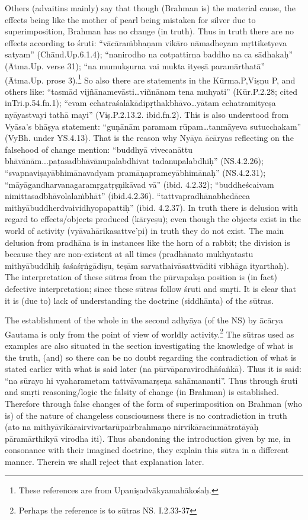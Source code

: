 Others (advaitins mainly) say that though (Brahman is) the material cause, the effects being like the mother of pearl being mistaken for silver due to superimposition, Brahman has no change (in truth). Thus in truth there are no effects according to śruti: “vācāraṁbhaṇam vikāro nāmadheyam mṛttiketyeva satyam” (Chānd.Up.6.1.4); “nanirodho na cotpattirna baddho na ca sādhakaḥ” (Ātma.Up. verse 31); “na mumukṣurna vai mukta ityeṣā paramārthatā” (Ātma.Up. prose 3).\footnote{These references are from Upaniṣadvākyamahākośaḥ.} So also there are statements in the  Kūrma.P,Viṣṇu P, and others like: “tasmād vijñānamevāsti…viñnānam tena muhyati” (Kūr.P.2.28; cited in\break Tri.p.54.fn.1);  “evam cchatraśalākādipṛthakbhāvo…yātam cchatramityeṣa nyāyastvayi tathā mayi” (Viṣ.P.2.13.2. ibid.fn.2). This is also understood from Vyāsa’s bhāṣya statement: “guṇānām paramam rūpam\-…tanmāyeva sutucchakam” (VyBh. under YS.4.13). That is the reason why Nyāya ācāryas reflecting on the falsehood of change mention: “buddhyā vivecanāttu bhāvānām...paṭasadbhāvānupalabdhivat tadanupalabdhiḥ” (NS.4.2.26); “svapnaviṣayābhimānavadyam pramā\-ṇaprameyābhimānaḥ” (NS.4.2.31); “māyāgandharvanagaramṛgatṛṣṇi\-kāvad vā” (ibid. 4.2.32); “buddheścaivam nimittasadbhāvolalaṁbhāt” (ibid.4.2.36). ``tattvapradhānabhedācca mithyābuddherdvaividhyopapattiḥ'' (ibid. 4.2.37). In truth there is delusion with regard to effects/objects produced (kāryeṣu); even though the objects exist in the world of activity (vyāvahārikasattve’pi) in truth they do not exist. The main delusion from pradhāna is in instances like the horn of a rabbit; the division is because they are non-existent at all times (pradhānato mukhyatastu mithyābuddhiḥ śaśaśṛṅgādiṣu, teṣām sarvathaivāsattvā\-diti vibhāga ityarthaḥ). The interpretation of these sūtras from the pūrvapakṣa position is (in fact) defective interpretation;  since these sūtras follow śruti and smṛti. It is clear that it is (due to) lack of understanding the doctrine (siddhānta) of the sūtras.

The establishment of the whole in the second adhyāya (of the NS) by ācārya Gautama is only from the point of view of worldly activity.\footnote{Perhaps the reference is to sūtras NS. I.2.33-37} The sūtras used as examples are also situated in the section investigating the knowledge of what is the truth, (and) so there can be no doubt regarding the contradiction of what is stated earlier with what is said later (na pūrvāparavirodhāśaṅkā). Thus it is said: “na sūrayo hi vyaharametam tattvāvamarṣeṇa sahāmananti”. Thus through śruti and smṛti reasoning/logic the falsity of change (in Brahman) is established. Therefore through false changes of the form of superimposition on Brahman (who is) of the nature of changeless consciousness there is no contradiction in truth (ato na mithyāvikārairvivartarūpairbrahmaṇo nirvikāracinmātratāyāḥ pāramārthikyā virodha iti). Thus abandoning the introduction given by me, in consonance with their imagined doctrine, they explain this sūtra in a different manner. Therein we shall reject that explanation later.

